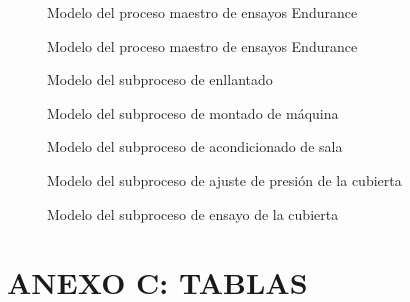 \begin{figure}[H]
	\begin{center}
		
	\end{center}
	\caption{Modelo del proceso maestro de ensayos Endurance}
\end{figure}

\begin{figure}[H]
	\begin{center}
		
	\end{center}
	\caption{Modelo del proceso maestro de ensayos Endurance}
\end{figure}

\begin{figure}[H]
	\begin{center}
		
	\end{center}
	\caption{Modelo del subproceso de enllantado}
\end{figure}

\begin{figure}[H]
	\begin{center}
		
	\end{center}
	\caption{Modelo del subproceso de montado de máquina}
\end{figure}

\begin{figure}[H]
	\begin{center}
		
	\end{center}
	\caption{Modelo del subproceso de acondicionado de sala}
\end{figure}

\begin{figure}[H]
	\begin{center}
		
	\end{center}
	\caption{Modelo del subproceso de ajuste de presión de la cubierta}
\end{figure}

\begin{figure}[H]
	\begin{center}
		
	\end{center}
	\caption{Modelo del subproceso de ensayo de la cubierta}
\end{figure}

\section{ANEXO C: TABLAS}\label{apnd4}

